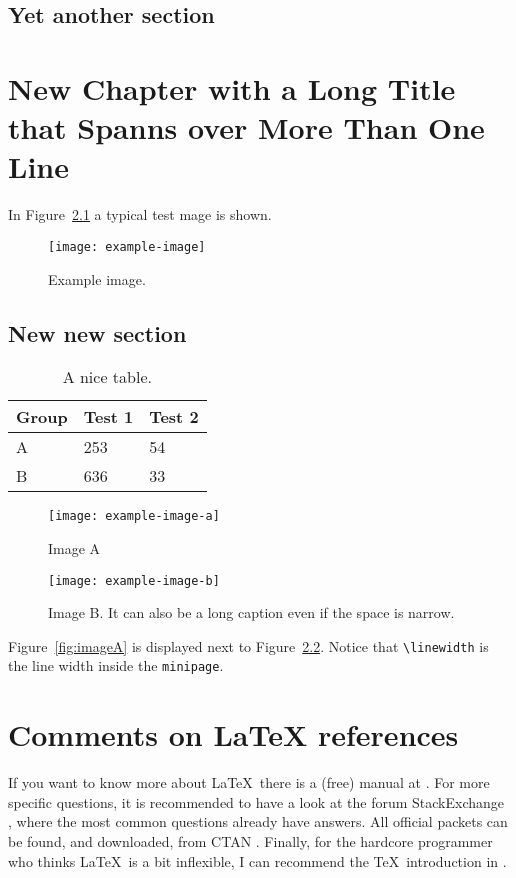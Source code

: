\documentclass[11pt,twoside]{eitExjobb}
\begin{document}
\section{Yet another section}
\lipsum[7]

\chapter[A Shorter Chapter Title]{New Chapter with a Long Title that Spanns over More Than One Line}
In Figure~\ref{fig:testfig} a typical test mage is shown.
\begin{figure}[htbp]
  \centering
  \texttt{[image: example-image]}
  \caption{Example image.}
  \label{fig:testfig}
\end{figure}

\section{New new section}
\lipsum[1-2]
\begin{table}[htbp]
  \centering
  \begin{tabular}{lll}
    Group & Test 1 & Test 2\\\hline
    A & 253 &54\\
    B & 636 & 33
  \end{tabular}
  \caption{A nice table.}
  \label{tab:tabletest}
\end{table}

\lipsum[3]
\begin{figure}[htbp]
  \begin{minipage}[t]{0.5\linewidth}
    \centering
    \texttt{[image: example-image-a]}
    \caption{Image A}
    \label{fig:imageA}
  \end{minipage}%
  \begin{minipage}[t]{0.5\linewidth}
    \centering
    \texttt{[image: example-image-b]}
    \caption{Image B. It can also be a long caption even if the space is narrow.}
    \label{fig:imageB}
  \end{minipage}
\end{figure}

Figure~\ref{fig:imageA} is displayed next to Figure~\ref{fig:imageB}. Notice that \verb|\linewidth| is the line width inside the \verb|minipage|.

\lipsum[4]

\chapter{Comments on LaTeX references}
If you want to know more about \LaTeX\ there is a (free) manual at \cite{cite:NotShort}. For more specific questions, it is recommended to have a look at the forum StackExchange \cite{cite:TeX.SX}, where the most common questions already have answers. All official packets can be found, and downloaded, from CTAN \cite{cite:CTAN}. Finally, for the hardcore programmer who thinks \LaTeX\ is a bit inflexible, I can recommend the \TeX\ introduction in \cite{cite:TeXimpatient}.
\end{document}
